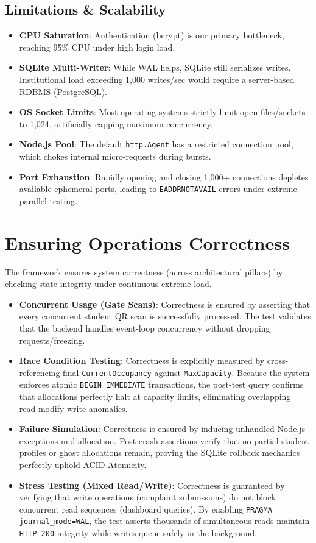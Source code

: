 \documentclass[sigconf]{acmart}
\begin{document}
\subsection{Limitations \& Scalability}
\begin{itemize}[leftmargin=*]
    \item \textbf{CPU Saturation}: Authentication (bcrypt) is our primary bottleneck, reaching 95\% CPU under high login load.
    \item \textbf{SQLite Multi-Writer}: While WAL helps, SQLite still serializes writes. Institutional load exceeding 1,000 writes/sec would require a server-based RDBMS (PostgreSQL).
    \item \textbf{OS Socket Limits}: Most operating systems strictly limit open files/sockets to 1,024, artificially capping maximum concurrency.
    \item \textbf{Node.js Pool}: The default \texttt{http.Agent} has a restricted connection pool, which chokes internal micro-requests during bursts.
    \item \textbf{Port Exhaustion}: Rapidly opening and closing 1,000+ connections depletes available ephemeral ports, leading to \texttt{EADDRNOTAVAIL} errors under extreme parallel testing.
\end{itemize}

\section{Ensuring Operations Correctness}
The framework ensures system correctness (across  architectural pillars) by checking state integrity under continuous extreme load.

\begin{itemize}
    \item \textbf{Concurrent Usage (Gate Scans)}: Correctness is ensured by asserting that every concurrent student QR scan is successfully processed. The test validates that the backend handles event-loop concurrency without dropping requests/freezing.
    \item \textbf{Race Condition Testing}: Correctness is explicitly measured by cross-referencing final \texttt{CurrentOccupancy} against \texttt{MaxCapacity}. Because the system enforces atomic \texttt{BEGIN IMMEDIATE} transactions, the post-test query confirms that allocations perfectly halt at capacity limits, eliminating overlapping read-modify-write anomalies.
    \item \textbf{Failure Simulation}: Correctness is ensured by inducing unhandled Node.js exceptions mid-allocation. Post-crash assertions verify that no partial student profiles or ghost allocations remain, proving the SQLite rollback mechanics perfectly uphold ACID Atomicity.
    \item \textbf{Stress Testing (Mixed Read/Write)}: Correctness is guaranteed by verifying that write operations (complaint submissions) do not block concurrent read sequences (dashboard queries). By enabling \texttt{PRAGMA journal\_mode=WAL}, the test asserts thousands of simultaneous reads maintain \texttt{HTTP 200} integrity while writes queue safely in the background.
\end{itemize}
\end{document}
